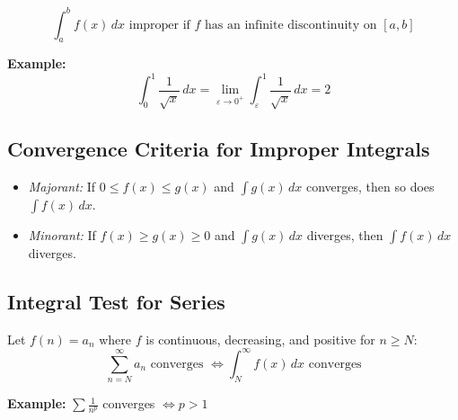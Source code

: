 \[
\int_a^b f(x)\,dx \text{ improper if } f \text{ has an infinite discontinuity on } [a, b]
\]

\textbf{Example:}
\[
\int_0^1 \frac{1}{\sqrt{x}}\,dx = \lim_{\varepsilon \to 0^+} \int_\varepsilon^1 \frac{1}{\sqrt{x}}\,dx = 2
\]

\subsection{Convergence Criteria for Improper Integrals}

\begin{itemize}[label=\(-\)]
\item \emph{Majorant:} If \(0 \le f(x) \le g(x)\) and \(\int g(x)\,dx\) converges, then so does \(\int f(x)\,dx\).
\item \emph{Minorant:} If \(f(x) \ge g(x) \ge 0\) and \(\int g(x)\,dx\) diverges, then \(\int f(x)\,dx\) diverges.
\end{itemize}

\subsection{Integral Test for Series}

Let \(f(n) = a_n\) where \(f\) is continuous, decreasing, and positive for \(n \ge N\):
\[
\sum_{n=N}^\infty a_n \text{ converges } \iff \int_N^\infty f(x)\,dx \text{ converges}
\]

\textbf{Example:} \(\sum \frac{1}{n^p}\) converges \(\iff p > 1\)
